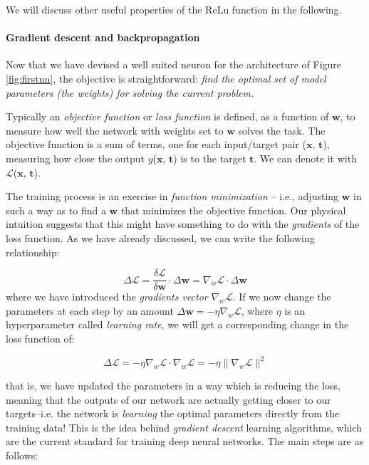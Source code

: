 We will discuss other useful properties of the ReLu function in the following.

\paragraph{Gradient descent and backpropagation}

Now that we have devised a well suited neuron for the architecture of Figure \ref{fig:firstnn}, the objective is straightforward: \emph{find the optimal set of \emph{model parameters} (the weights) for solving the current problem.} 

Typically an \emph{objective function} or \emph{loss function} is defined, as a function
of $\mathbf{w}$, to measure how well the network with weights set to $\mathbf{w}$ solves the task. 
The objective function is a sum of terms, one for each input/target pair ($\mathbf{x}$, $\mathbf{t}$),
measuring how close the output $y$($\mathbf{x}$, $\mathbf{t}$) is to the target $\mathbf{t}$. We can denote it with $\mathcal{L}$($\mathbf{x}$, $\mathbf{t}$).

The training process is an exercise in \emph{function minimization} – i.e., adjusting $\mathbf{w}$ in such a way as to find a $\mathbf{w}$ that minimizes the objective function. Our physical intuition suggests that this might have something to do with the \emph{gradients} of the loss function. As we have already discussed, we can write the following relationship:

\[
    \Delta \mathcal{L} = \frac{\delta \mathcal{L}}{\delta \mathbf{w}} \cdot \Delta \mathbf{w} = \nabla_w \mathcal{L} \cdot \Delta \mathbf{w} 
\]
 where we have introduced the \emph{gradients vector} $\nabla_w \mathcal{L}$. If we now change the parameters at each step by an amount $ \Delta \mathbf{w} = - \eta \nabla_w \mathcal{L}$, where $\eta$ is an hyperparameter called \emph{learning rate}, we will get a corresponding change in the loss function of:
 
 \[
    \Delta \mathcal{L} = -\eta \nabla_w \mathcal{L} \cdot \nabla_w \mathcal{L} = - \eta \|  \nabla_w \mathcal{L} \|^2
\]

that is, we have updated the parameters in a way which is reducing the loss, meaning that the outputs of our network are actually getting closer to our targets--i.e. the network is \emph{learning} the optimal parameters directly from the training data! This is the idea behind \emph{gradient descent} learning algorithms, which are the current standard for training deep neural networks. The main steps are as follows:

